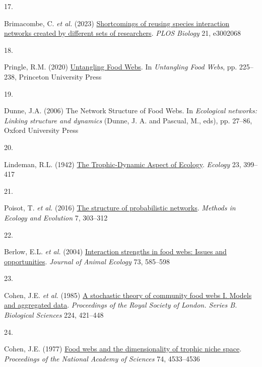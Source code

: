 \documentclass[
]{article}
\newlength{\cslhangindent}
\newlength{\csllabelwidth}
\newenvironment{CSLReferences}[2] %
 {\begin{list}{}{%
  \setlength{\itemindent}{0pt}
  \setlength{\leftmargin}{0pt}
  \setlength{\parsep}{0pt}
  \ifodd #1
   \setlength{\leftmargin}{\cslhangindent}
   \setlength{\itemindent}{-1\cslhangindent}
  \fi
  \setlength{\itemsep}{#2\baselineskip}}}
 {\end{list}}
\newcommand{\CSLLeftMargin}[1]{\parbox[t]{\csllabelwidth}{\strut#1\strut}}
\newcommand{\CSLRightInline}[1]{\parbox[t]{\linewidth - \csllabelwidth}{\strut#1\strut}}
\begin{document}
\begin{CSLReferences}{0}{0}
\CSLLeftMargin{17. }%
\CSLRightInline{Brimacombe, C. \emph{et al.} (2023)
\href{https://doi.org/10.1371/journal.pbio.3002068}{Shortcomings of
reusing species interaction networks created by different sets of
researchers}. \emph{PLOS Biology} 21, e3002068}

\CSLLeftMargin{18. }%
\CSLRightInline{Pringle, R.M. (2020)
\href{https://doi.org/10.1515/9780691195322-020}{Untangling {Food
Webs}}. In \emph{Untangling {Food Webs}}, pp. 225--238, Princeton
University Press}

\CSLLeftMargin{19. }%
\CSLRightInline{Dunne, J.A. (2006) The {Network Structure} of {Food
Webs}. In \emph{Ecological networks: {Linking} structure and dynamics}
(Dunne, J. A. and Pascual, M., eds), pp. 27--86, Oxford University
Press}

\CSLLeftMargin{20. }%
\CSLRightInline{Lindeman, R.L. (1942)
\href{https://doi.org/10.2307/1930126}{The {Trophic-Dynamic Aspect} of
{Ecology}}. \emph{Ecology} 23, 399--417}

\CSLLeftMargin{21. }%
\CSLRightInline{Poisot, T. \emph{et al.} (2016)
\href{https://doi.org/10}{The structure of probabilistic networks}.
\emph{Methods in Ecology and Evolution} 7, 303--312}

\CSLLeftMargin{22. }%
\CSLRightInline{Berlow, E.L. \emph{et al.} (2004)
\href{https://doi.org/10.1111/j.0021-8790.2004.00833.x}{Interaction
strengths in food webs: Issues and opportunities}. \emph{Journal of
Animal Ecology} 73, 585--598}

\CSLLeftMargin{23. }%
\CSLRightInline{Cohen, J.E. \emph{et al.} (1985)
\href{https://doi.org/10.1098/rspb.1985.0042}{A stochastic theory of
community food webs {I}. {Models} and aggregated data}.
\emph{Proceedings of the Royal Society of London. Series B. Biological
Sciences} 224, 421--448}

\CSLLeftMargin{24. }%
\CSLRightInline{Cohen, J.E. (1977)
\href{https://doi.org/10.1073/pnas.74.10.4533}{Food webs and the
dimensionality of trophic niche space}. \emph{Proceedings of the
National Academy of Sciences} 74, 4533--4536}


\end{CSLReferences}
\end{document}

